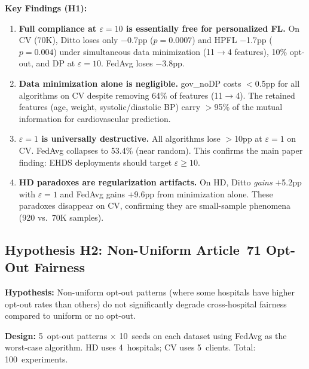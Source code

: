 \documentclass[conference]{IEEEtran}
\begin{document}
\noindent\textbf{Key Findings (H1):}
\begin{enumerate}
    \item \textbf{Full compliance at $\varepsilon{=}10$ is essentially free for personalized FL.} On CV (70K), Ditto loses only $-$0.7pp ($p{=}0.0007$) and HPFL $-$1.7pp ($p{=}0.004$) under simultaneous data minimization (11$\to$4 features), 10\% opt-out, and DP at $\varepsilon{=}10$. FedAvg loses $-$3.8pp.
    \item \textbf{Data minimization alone is negligible.} gov\_noDP costs $<$0.5pp for all algorithms on CV despite removing 64\% of features (11$\to$4). The retained features (age, weight, systolic/diastolic BP) carry $>$95\% of the mutual information for cardiovascular prediction.
    \item \textbf{$\varepsilon{=}1$ is universally destructive.} All algorithms lose $>$10pp at $\varepsilon{=}1$ on CV. FedAvg collapses to 53.4\% (near random). This confirms the main paper finding: EHDS deployments should target $\varepsilon \geq 10$.
    \item \textbf{HD paradoxes are regularization artifacts.} On HD, Ditto \textit{gains} $+$5.2pp with $\varepsilon{=}1$ and FedAvg gains $+$9.6pp from minimization alone. These paradoxes disappear on CV, confirming they are small-sample phenomena (920 vs.\ 70K samples).
\end{enumerate}

\subsection{Hypothesis H2: Non-Uniform Article~71 Opt-Out Fairness}
\label{sec:h2_optout}

\textbf{Hypothesis:} Non-uniform opt-out patterns (where some hospitals have higher opt-out rates than others) do not significantly degrade cross-hospital fairness compared to uniform or no opt-out.

\textbf{Design:} 5~opt-out patterns $\times$ 10~seeds on each dataset using FedAvg as the worst-case algorithm. HD uses 4~hospitals; CV uses 5~clients. Total: 100~experiments.
\end{document}
